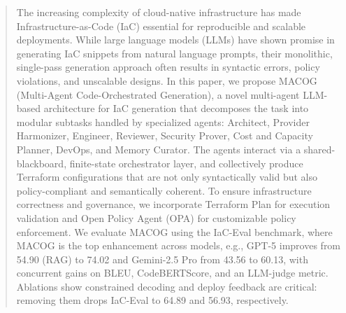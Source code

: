 \documentclass[manuscript,screen,nonacm]{acmart}
\begin{document}
\begin{abstract}
  The increasing complexity of cloud-native infrastructure has made Infrastructure-as-Code (IaC) essential for reproducible and scalable deployments. While large language models (LLMs) have shown promise in generating IaC snippets from natural language prompts, their monolithic, single-pass generation approach often results in syntactic errors, policy violations, and unscalable designs. In this paper, we propose MACOG (Multi-Agent Code-Orchestrated Generation), a novel multi-agent LLM-based architecture for IaC generation that decomposes the task into modular subtasks handled by specialized agents: Architect, Provider Harmonizer, Engineer, Reviewer, Security Prover, Cost and Capacity Planner, DevOps, and Memory Curator. The agents interact via a shared-blackboard, finite-state orchestrator layer, and collectively produce Terraform configurations that are not only syntactically valid but also policy-compliant and semantically coherent. To ensure infrastructure correctness and governance, we incorporate Terraform Plan for execution validation and Open Policy Agent (OPA) for customizable policy enforcement. We evaluate MACOG using the IaC-Eval benchmark, where MACOG is the top enhancement across models, e.g., GPT-5 improves from 54.90 (RAG) to 74.02 and Gemini-2.5 Pro from 43.56 to 60.13, with concurrent gains on BLEU, CodeBERTScore, and an LLM-judge metric. Ablations show constrained decoding and deploy feedback are critical: removing them drops IaC-Eval to 64.89 and 56.93, respectively.
\end{abstract}






\end{document}
